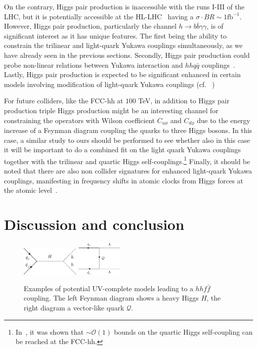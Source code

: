 On the contrary, Higgs pair production is inaccessible with the runs I-III of the LHC, but it is potentially accessible at the HL-LHC~\cite{Binoth:2006ym} having a $ \sigma \cdot BR\sim 1\mathrm{fb}^{-1}$. However, Higgs pair production, particularly the channel $h \to b \bar b \gamma \gamma $, is of significant interest as it has unique features. The first being the ability to constrain the trilinear and light-quark Yukawa couplings simultaneously, as we have already seen in the previous sections. Secondly, Higgs pair production could probe non-linear relations between Yukawa interaction and $hh q\bar q$ couplings~\cite{Contino:2012xk}. Lastly, Higgs pair production is expected to be significant enhanced in certain models involving modification of light-quark Yukawa couplings (cf. ~\cite{Bar-Shalom:2018rjs,Bauer:2017cov,Egana-Ugrinovic:2021uew})

For future colliders, like the FCC-hh at $100$ TeV, in addition to Higgs pair production triple Higgs production might be an interesting channel for constraining the operators with Wilson coefficient $C_{u\phi}$ and $C_{d\phi}$ due to the energy increase of a Feynman diagram coupling the quarks to three Higgs bosons.   In this case, a similar study to ours should be performed to see whether also in this case it will be important to do a combined fit on the light quark Yukawa couplings together with the trilinear and quartic Higgs self-couplings.\footnote{In~\cite{Papaefstathiou:2047255}, it was shown that $\sim \mathcal{O}(1)$ bounds on the quartic Higgs self-coupling can be reached at the FCC-hh.}
Finally, it should be noted that there are also non collider signatures for enhanced light-quark Yukawa couplings, manifesting in frequency shifts in atomic clocks from Higgs forces at the atomic level~\cite{Delaunay:2016brc}. 
\section{Discussion and conclusion \label{sec:concly}}
\begin{figure}[!t]
	\centering
	\includegraphics[width = 0.25\textwidth]{./fig/qqh_2hdm}
	\hspace{0.5 cm}
	\includegraphics[width = 0.2\textwidth]{./fig/VLQ}
	\caption{Examples of potential UV-complete models leading to a  $hh f \bar{f} $ coupling. The left Feynman diagram shows a heavy Higgs $H$, the right diagram a vector-like quark $\mathcal Q $.} %
	\label{fig_uv_qqhh}
\end{figure}


